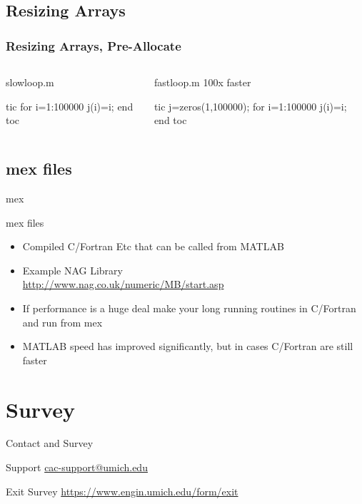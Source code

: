 \documentclass[handout]{beamer}
\begin{document}
   \subsection{Resizing Arrays}
\begin{frame}[fragile]
\frametitle{Resizing Arrays, Pre-Allocate}
\begin{columns}[T]
\begin{column}{5cm}
 \begin{block}{slowloop.m}
  \begin{semiverbatim}
tic
for i=1:100000
    j(i)=i;
end
toc
  \end{semiverbatim}
 \end{block}
\end{column}
\begin{column}{5cm}
\begin{block}{fastloop.m 100x faster}
\begin{semiverbatim}
tic
j=zeros(1,100000);
for i=1:100000
    j(i)=i;
end
toc
\end{semiverbatim}
\end{block}
\end{column}
\end{columns}
\end{frame}

   \subsection{mex files}
\begin{frame}{mex}
\begin{block}{mex files}
 \begin{itemize}
  \item Compiled C/Fortran Etc that can be called from MATLAB
  \item Example NAG Library \\
\url{http://www.nag.co.uk/numeric/MB/start.asp}
  \item If performance is a huge deal make your long running routines in C/Fortran and run from mex
  \item MATLAB speed has improved significantly, but in cases C/Fortran are still faster
 \end{itemize}
\end{block}
%
\end{frame}
  \section{Survey}
  \begin{frame}{Contact and Survey}
   \begin{block}{Support}
    \url{cac-support@umich.edu}
   \end{block}
   \begin{block}{Exit Survey}
    \url{https://www.engin.umich.edu/form/exit}
   \end{block}
  \end{frame}
\end{document}
